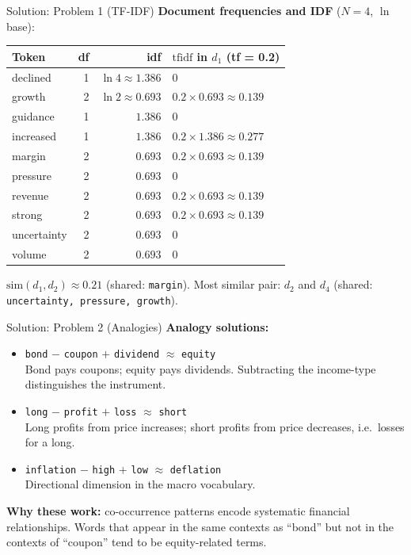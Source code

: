 \documentclass[9pt,t]{beamer}
\begin{document}
\begin{frame}{Solution: Problem 1 (TF-IDF)}
  \textbf{Document frequencies and IDF} ($N=4$, $\ln$ base):
  \medskip
  \begin{center}
  \scriptsize
  \begin{tabular}{@{}lrrl@{}}
    \toprule
    Token & df & idf & $\mathrm{tfidf}$ in $d_1$ (tf = 0.2) \\
    \midrule
    declined    & 1 & $\ln 4 \approx 1.386$ & 0 \\
    growth      & 2 & $\ln 2 \approx 0.693$ & $0.2 \times 0.693 \approx 0.139$ \\
    guidance    & 1 & $1.386$ & 0 \\
    increased   & 1 & $1.386$ & $0.2 \times 1.386 \approx 0.277$ \\
    margin      & 2 & $0.693$ & $0.2 \times 0.693 \approx 0.139$ \\
    pressure    & 2 & $0.693$ & 0 \\
    revenue     & 2 & $0.693$ & $0.2 \times 0.693 \approx 0.139$ \\
    strong      & 2 & $0.693$ & $0.2 \times 0.693 \approx 0.139$ \\
    uncertainty & 2 & $0.693$ & 0 \\
    volume      & 2 & $0.693$ & 0 \\
    \bottomrule
  \end{tabular}
  \end{center}
  \medskip
  $\mathrm{sim}(d_1, d_2) \approx 0.21$ (shared: \texttt{margin}).
  Most similar pair: $d_2$ and $d_4$ (shared: \texttt{uncertainty, pressure, growth}).
\end{frame}

\begin{frame}{Solution: Problem 2 (Analogies)}
  \textbf{Analogy solutions:}
  \begin{itemize}
    \item \texttt{bond} $-$ \texttt{coupon} $+$ \texttt{dividend} $\approx$ \texttt{equity}\\
          {\small Bond pays coupons; equity pays dividends. Subtracting the income-type distinguishes the instrument.}
    \item \texttt{long} $-$ \texttt{profit} $+$ \texttt{loss} $\approx$ \texttt{short}\\
          {\small Long profits from price increases; short profits from price decreases, i.e.\ losses for a long.}
    \item \texttt{inflation} $-$ \texttt{high} $+$ \texttt{low} $\approx$ \texttt{deflation}\\
          {\small Directional dimension in the macro vocabulary.}
  \end{itemize}
  \medskip
  \textbf{Why these work:} co-occurrence patterns encode systematic financial relationships.
  Words that appear in the same contexts as ``bond'' but not in the contexts of ``coupon''
  tend to be equity-related terms.
\end{frame}
\end{document}
